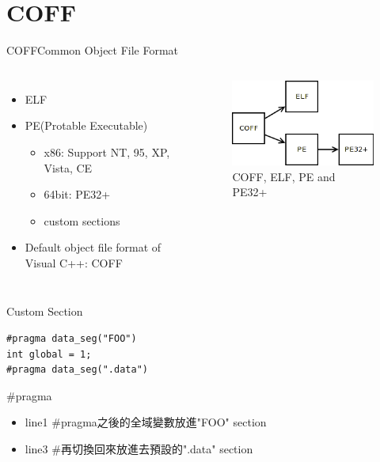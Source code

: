 \section{COFF}

\begin{frame}[t]{COFF}{Common Object File Format}
    \begin{columns}
    \begin{itemize}
        \item ELF
        \item PE(Protable Executable)
        \begin{itemize}
            \item x86: Support NT, 95, XP, Vista, CE
            \item 64bit: PE32+
            \item custom sections
        \end{itemize}
        \item Default object file format of Visual C++: COFF
    \end{itemize}
        \begin{figure}
            \begin{center}
                \includegraphics[width=\textwidth]{./image/COFF.png}
                \caption{COFF, ELF, PE and PE32+}
            \end{center}
        \end{figure}
    \end{columns}
\end{frame}


\begin{frame}[fragile]{Custom Section}
    \begin{lstlisting}
#pragma data_seg("FOO")
int global = 1;
#pragma data_seg(".data")
    \end{lstlisting}
    \begin{block}{\#pragma}
        \begin{itemize}
            \item line1 \#pragma之後的全域變數放進"FOO" section
            \item line3 \#再切換回來放進去預設的".data" section
        \end{itemize}
    \end{block}
\end{frame}


